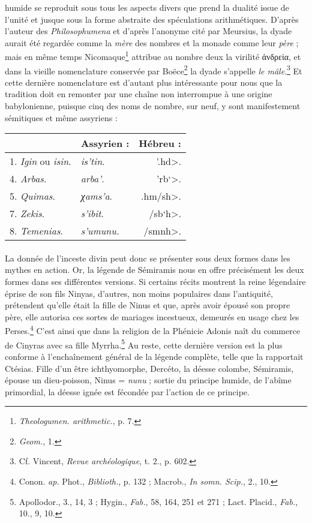 \documentclass[a4paper, 11pt, oneside]{article}
\begin{document}
humide se reproduit sous tous les aspects divers que prend la dualité issue de l'unité et jusque sous la forme abstraite des spéculations arithmétiques. D'après l'auteur des \emph{Philosophumena} et d'après l'anonyme cité par Meursius, la dyade aurait été regardée comme la \emph{mère} des nombres et la monade comme leur \emph{père} ; mais en même temps Nicomaque\footnote{\emph{Theologumen. arithmetic.}, p. 7.} attribue au nombre deux la virilité ἀνδρεία, et dans la vieille nomenclature conservée par Boëce\footnote{\emph{Geom.}, 1.} la dyade s'appelle \emph{le mâle}.\footnote{Cf. Vincent, \emph{Revue archéologique}, t. 2., p. 602.} Et cette dernière nomenclature est d'autant plus intéressante pour nous que la tradition doit en remonter par une chaîne non interrompue à une origine babylonienne, puisque cinq des noms de nombre, sur neuf, y sont manifestement sémitiques et même assyriens :
\begin{table}[H]
    \centering
    \small
    \begin{tabular}{l l r}
    \hline
        ~ & Assyrien : & Hébreu :   \\ \hline
        1. \emph{Igin} ou \emph{isin}. & \emph{is'tin}. & \<'.hd>. \\
        4. \emph{Arbas}. & \emph{arba'}. & \<'rb`>. \\ 
        5. \emph{Quimas}. & \emph{χams'a}. & \<.hm/sh>. \\ 
        7. \emph{Zekis}. & \emph{s'ibit}. & \</sb`h>. \\ 
        8. \emph{Temenias}. & \emph{s'umunu.} & \</smnh>. \\ 
    \end{tabular}
\end{table}
\paragraph{}
La donnée de l'inceste divin peut donc se présenter sous deux formes dans les mythes en action. Or, la légende de Sémiramis nous en offre précisément les deux formes dans ses différentes versions. Si certains récits montrent la reine légendaire éprise de son fils Ninyas, d'autres, non moins populaires dans l'antiquité, prétendent qu'elle était la fille de Ninus et que, après avoir épousé son propre père, elle autorisa ces sortes de mariages incestueux, demeurés en usage chez les Perses.\footnote{Conon. \emph{ap.} Phot., \emph{Biblioth.}, p. 132 ; Macrob., \emph{In somn. Scip.}, 2., 10.} C'est ainsi que dans la religion de la Phénicie Adonis naît du commerce de Cinyras avec sa fille Myrrha.\footnote{Apollodor., 3., 14, 3 ; Hygin., \emph{Fab.}, 58, 164, 251 et 271 ; Lact. Placid., \emph{Fab.}, 10., 9, 10.} Au reste, cette dernière version est la plus conforme à l'enchaînement général de la légende complète, telle que la rapportait Ctésias. Fille d'un être ichthyomorphe, Dercéto, la déesse colombe, Sémiramis, épouse un dieu-poisson, Ninus = \emph{nunu} ; sortie du principe humide, de l'abîme primordial, la déesse ignée est fécondée par l'action de ce principe.
\end{document}
